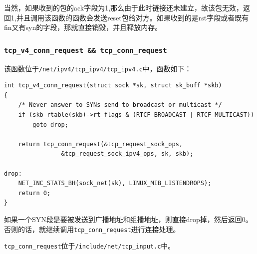                 当然，如果收到的包的ack字段为1,那么由于此时链接还未建立，故该包无效，返回1,并且调用该函数的函数会发送reset包给对方。如果收到的是rst字段或者既有fin又有syn的字段，那就直接销毁，并且释放内存。

            \subsubsection{\texttt{tcp_v4_conn_request && tcp_conn_request}}

                该函数位于\texttt{/net/ipv4/tcp_ipv4/tcp_ipv4.c}中，函数如下：
\begin{verbatim}
int tcp_v4_conn_request(struct sock *sk, struct sk_buff *skb)
{
    /* Never answer to SYNs send to broadcast or multicast */
    if (skb_rtable(skb)->rt_flags & (RTCF_BROADCAST | RTCF_MULTICAST))
        goto drop;

    return tcp_conn_request(&tcp_request_sock_ops,
                &tcp_request_sock_ipv4_ops, sk, skb);

drop:
    NET_INC_STATS_BH(sock_net(sk), LINUX_MIB_LISTENDROPS);
    return 0;
}
\end{verbatim}
                
        如果一个SYN段是要被发送到广播地址和组播地址，则直接drop掉，然后返回0。否则的话，就继续调用\texttt{tcp_conn_request}进行连接处理。

        \texttt{tcp_conn_request}位于\texttt{/include/net/tcp_input.c}中。

